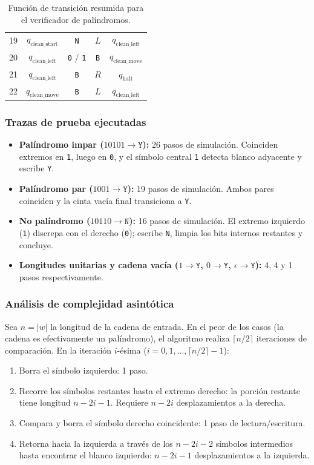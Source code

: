 \documentclass[11pt,letterpaper]{article}
\begin{document}
\begin{table}[h!]
\begin{tabular}{ccccc}
\midrule
19 & $q_{\text{clean\_start}}$ & \texttt{N} & $L$ & $q_{\text{clean\_left}}$ \\
20 & $q_{\text{clean\_left}}$ & \texttt{0} / \texttt{1} & \texttt{B} & $q_{\text{clean\_move}}$ \\
21 & $q_{\text{clean\_left}}$ & \texttt{B} & $R$ & $q_{\text{halt}}$ \\
22 & $q_{\text{clean\_move}}$ & \texttt{B} & $L$ & $q_{\text{clean\_left}}$ \\
\bottomrule
\end{tabular}
\caption{Función de transición resumida para el verificador de palíndromos.}
\end{table}

\subsubsection{Trazas de prueba ejecutadas}
\begin{itemize}
    \item \textbf{Palíndromo impar ($10101 \to \texttt{Y}$):} 26 pasos de simulación. Coinciden extremos en \texttt{1}, luego en \texttt{0}, y el símbolo central \texttt{1} detecta blanco adyacente y escribe \texttt{Y}.
    \item \textbf{Palíndromo par ($1001 \to \texttt{Y}$):} 19 pasos de simulación. Ambos pares coinciden y la cinta vacía final transiciona a \texttt{Y}.
    \item \textbf{No palíndromo ($10110 \to \texttt{N}$):} 16 pasos de simulación. El extremo izquierdo (\texttt{1}) discrepa con el derecho (\texttt{0}); escribe \texttt{N}, limpia los bits internos restantes y concluye.
    \item \textbf{Longitudes unitarias y cadena vacía ($1 \to \texttt{Y}$, $0 \to \texttt{Y}$, $\epsilon \to \texttt{Y}$):} 4, 4 y 1 pasos respectivamente.
\end{itemize}

\subsubsection{Análisis de complejidad asintótica}
Sea $n = |w|$ la longitud de la cadena de entrada. En el peor de los casos (la cadena es efectivamente un palíndromo), el algoritmo realiza $\lceil n/2 \rceil$ iteraciones de comparación. En la iteración $i$-ésima ($i = 0, 1, \dots, \lceil n/2 \rceil - 1$):
\begin{enumerate}
    \item Borra el símbolo izquierdo: 1 paso.
    \item Recorre los símbolos restantes hasta el extremo derecho: la porción restante tiene longitud $n - 2i - 1$. Requiere $n - 2i$ desplazamientos a la derecha.
    \item Compara y borra el símbolo derecho coincidente: 1 paso de lectura/escritura.
    \item Retorna hacia la izquierda a través de los $n - 2i - 2$ símbolos intermedios hasta encontrar el blanco izquierdo: $n - 2i - 1$ desplazamientos a la izquierda.
\end{enumerate}
\end{document}
